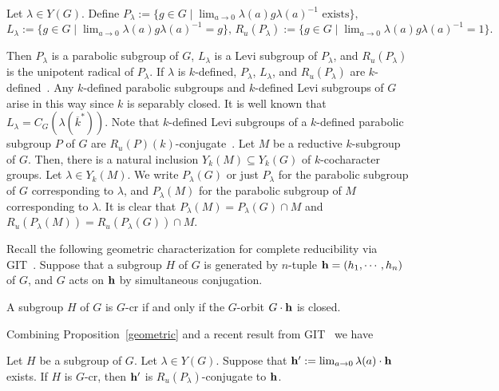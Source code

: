 \begin{defn}\label{R-parabolic}
Let $\lambda\in Y(G)$. Define
$
P_\lambda := \{ g\in G \mid \displaystyle\lim_{a\rightarrow 0}\lambda(a)g\lambda(a)^{-1} \text{ exists}\}, $\\
$L_\lambda := \{ g\in G \mid \displaystyle\lim_{a\rightarrow 0}\lambda(a)g\lambda(a)^{-1} = g\}, \,
R_u(P_\lambda) := \{ g\in G \mid  \displaystyle\lim_{a\rightarrow0}\lambda(a)g\lambda(a)^{-1} = 1\}. 
$
\end{defn}
Then $P_\lambda$ is a parabolic subgroup of $G$, $L_\lambda$ is a Levi subgroup of $P_\lambda$, and $R_u(P_\lambda)$ is the unipotent radical of $P_\lambda$. If $\lambda$ is $k$-defined, $P_\lambda$, $L_\lambda$, and $R_u(P_\lambda)$ are $k$-defined~\cite[Sec.~2.1-2.3]{Richardson-conjugacy-Duke}. Any $k$-defined parabolic subgroups and $k$-defined Levi subgroups of $G$ arise in this way since $k$ is separably closed. It is well known that $L_\lambda = C_G(\lambda(\overline k^*))$. Note that $k$-defined Levi subgroups of a $k$-defined parabolic subgroup $P$ of $G$ are $R_u(P)(k)$-conjugate~\cite[Lem.~2.5()]{Bate-uniform-TransAMS}. Let $M$ be a reductive $k$-subgroup of $G$. Then, there is a natural inclusion $Y_k(M)\subseteq Y_k(G)$ of $k$-cocharacter groups. Let $\lambda\in Y_k(M)$. We write $P_\lambda(G)$ or just $P_\lambda$ for the parabolic subgroup of $G$ corresponding to $\lambda$, and $P_\lambda(M)$ for the parabolic subgroup of $M$ corresponding to $\lambda$. It is clear that $P_\lambda(M) = P_\lambda(G)\cap M$ and $R_u(P_\lambda(M)) = R_u(P_\lambda(G))\cap M$. 

Recall the following geometric characterization for complete reducibility via GIT~\cite{Bate-geometric-Inventione}. Suppose that a subgroup $H$ of $G$ is generated by $n$-tuple ${\bf h}=(h_1,\cdots, h_n)$ of $G$, and $G$ acts on ${\bf h}$ by simultaneous conjugation. 
\begin{prop}\label{geometric}
A subgroup $H$ of $G$ is $G$-cr if and only if the $G$-orbit $G\cdot {\bf h}$ is closed. 
\end{prop}
Combining Proposition~\ref{geometric} and a recent result from GIT~\cite[Thm.~3.3]{Bate-uniform-TransAMS} we have
\begin{prop}\label{unipotentconjugate}
Let $H$ be a subgroup of $G$. Let $\lambda\in Y(G)$. Suppose that ${\bf h'}:=\lim_{a\rightarrow 0}\lambda(a)\cdot {\bf h}$ exists. If $H$ is $G$-cr, then ${\bf h'}$ is $R_u(P_\lambda)$-conjugate to ${\bf h}$. 
\end{prop}

